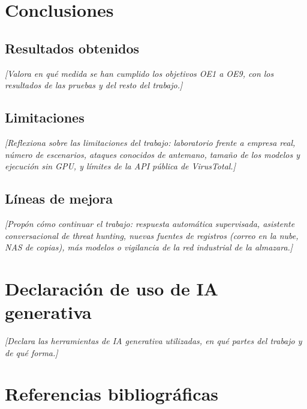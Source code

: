 \documentclass[11pt,a4paper,oneside]{report}
\newcommand{\guia}[1]{{\color{guia}\itshape[#1]}}
\begin{document}
\chapter{Conclusiones}
\section{Resultados obtenidos}
\guia{Valora en qué medida se han cumplido los objetivos OE1 a OE9, con los resultados de las pruebas y del resto del trabajo.}
\section{Limitaciones}
\guia{Reflexiona sobre las limitaciones del trabajo: laboratorio frente a empresa real, número de escenarios, ataques conocidos de antemano, tamaño de los modelos y ejecución sin GPU, y límites de la API pública de VirusTotal.}
\section{Líneas de mejora}
\guia{Propón cómo continuar el trabajo: respuesta automática supervisada, asistente conversacional de threat hunting, nuevas fuentes de registros (correo en la nube, NAS de copias), más modelos o vigilancia de la red industrial de la almazara.}

\chapter*{Declaración de uso de IA generativa}

\guia{Declara las herramientas de IA generativa utilizadas, en qué partes del trabajo y de qué forma.}

\chapter{Referencias bibliográficas}
\end{document}
